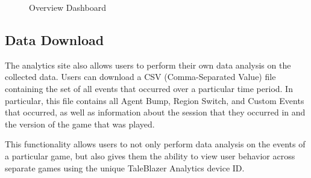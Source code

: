 \begin{figure}[hbt]
	\caption{\label{fig:overview_dashboard} Overview Dashboard}
\end{figure}


\subsection{Data Download}

The analytics site also allows users to perform their own data analysis on the collected data. Users can download a CSV (Comma-Separated Value) file containing the set of all events that occurred over a particular time period. In particular, this file contains all Agent Bump, Region Switch, and Custom Events that occurred, as well as information about the session that they occurred in and the version of the game that was played. 

This functionality allows users to not only perform data analysis on the events of a particular game, but also gives them the ability to view user behavior across separate games using the unique TaleBlazer Analytics device ID. 
















	




















